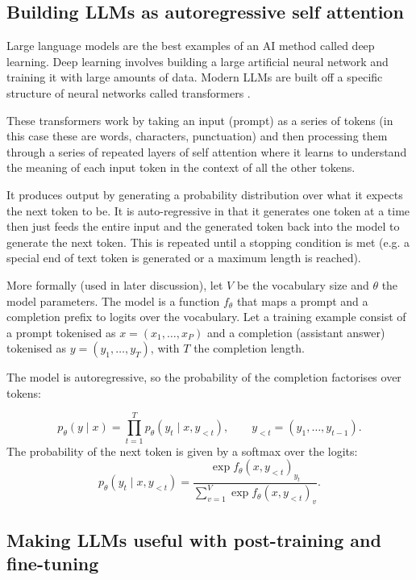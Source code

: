 \subsection{Building LLMs as autoregressive self attention}
\label{subsec:llms}

Large language models are the best examples of an AI method called deep learning. Deep learning involves building a large artificial neural network and training it with large amounts of data. Modern LLMs are built off a specific structure of neural networks called transformers \cite{vaswaniAttentionAllYou2017}. 

These transformers work by taking an input (prompt) as a series of tokens (in this case these are words, characters, punctuation) and then processing them through a series of repeated layers of self attention where it learns to understand the meaning of each input token in the context of all the other tokens.

It produces output by generating a probability distribution over what it expects the next token to be. It is auto-regressive in that it generates one token at a time then just feeds the entire input and the generated token back into the model to generate the next token. This is repeated until a stopping condition is met (e.g. a special end of text token is generated or a maximum length is reached).

More formally (used in later discussion), let $V$ be the vocabulary size and $\theta$ the model parameters. The model is a function $f_\theta$ that maps a prompt and a completion prefix to logits over the vocabulary.  Let a training example consist of a prompt tokenised as
$x = (x_1, \dots, x_P)$ and a completion (assistant answer) tokenised as
$y = (y_1, \dots, y_T)$, with $T$ the completion length.

The model is autoregressive, so the probability of the completion factorises over tokens:

\begin{equation}
  p_\theta(y \mid x) = \prod_{t=1}^{T} p_\theta\left(y_t \mid x, y_{<t}\right),
  \qquad y_{<t} = (y_1, \dots, y_{t-1}).
\end{equation}
The probability of the next token is given by a softmax over the logits:
\begin{equation}
  p_\theta\left(y_t \mid x, y_{<t}\right)
  = \frac{\exp f_\theta(x, y_{<t})_{y_t}}{\sum_{v=1}^{V} \exp f_\theta(x, y_{<t})_v}.
\end{equation}


\subsection{Making LLMs useful with post-training and fine-tuning}

